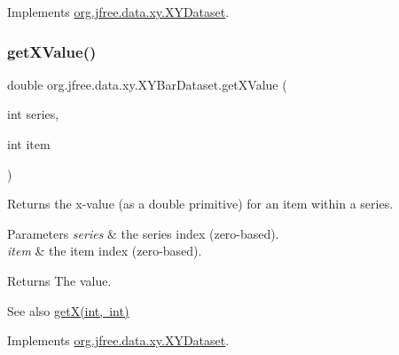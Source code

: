 Implements \mbox{\hyperlink{interfaceorg_1_1jfree_1_1data_1_1xy_1_1_x_y_dataset_a85c75ba5b69b551e96afd29d1732ba22}{org.\+jfree.\+data.\+xy.\+X\+Y\+Dataset}}.

\mbox{\label{classorg_1_1jfree_1_1data_1_1xy_1_1_x_y_bar_dataset_a84dba23fe8e4a19faff04e32a4bc0ea3}} 
\subsubsection{\texorpdfstring{get\+X\+Value()}{getXValue()}}
{\footnotesize\ttfamily double org.\+jfree.\+data.\+xy.\+X\+Y\+Bar\+Dataset.\+get\+X\+Value (\begin{DoxyParamCaption}\item[{int}]{series,  }\item[{int}]{item }\end{DoxyParamCaption})}

Returns the x-\/value (as a double primitive) for an item within a series.


\begin{DoxyParams}{Parameters}
{\em series} & the series index (zero-\/based). \\
\hline
{\em item} & the item index (zero-\/based).\\
\hline
\end{DoxyParams}
\begin{DoxyReturn}{Returns}
The value.
\end{DoxyReturn}
\begin{DoxySeeAlso}{See also}
\mbox{\hyperlink{classorg_1_1jfree_1_1data_1_1xy_1_1_x_y_bar_dataset_a517abc432ea872cbd470288b17725337}{get\+X(int, int)}} 
\end{DoxySeeAlso}


Implements \mbox{\hyperlink{interfaceorg_1_1jfree_1_1data_1_1xy_1_1_x_y_dataset_a65bd212539d8f7dfb3d3d36b5f42e083}{org.\+jfree.\+data.\+xy.\+X\+Y\+Dataset}}.

\mbox{\label{classorg_1_1jfree_1_1data_1_1xy_1_1_x_y_bar_dataset_a737db1e347fb9cb8b75179a54cf38287}} 
